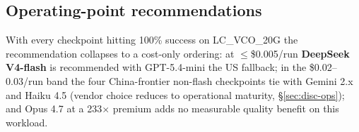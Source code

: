 \subsection{Operating-point recommendations}
\label{sec:results-ops}

With every checkpoint hitting 100\% success on LC\_VCO\_20G the
recommendation collapses to a cost-only ordering: at $\leq$\$0.005/run
\textbf{DeepSeek V4-flash} is recommended with GPT-5.4-mini the
US fallback; in the \$0.02--0.03/run band the four China-frontier
non-flash checkpoints tie with Gemini 2.x and Haiku 4.5 (vendor
choice reduces to operational maturity, \S\ref{sec:disc-ops}); and
Opus 4.7 at a 233$\times$ premium adds no measurable quality
benefit on this workload.
